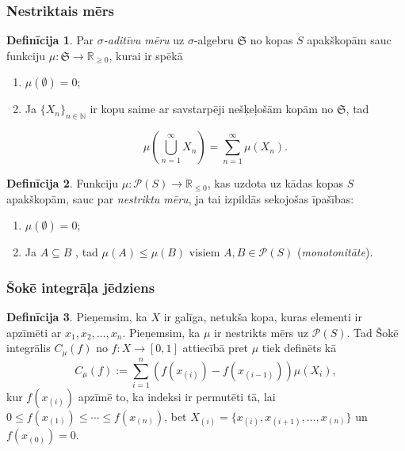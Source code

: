 \documentclass{beamer}
\theoremstyle{definition}
\newtheorem{definicija}{Definīcija}
\begin{document}
\begin{frame}
\frametitle{Nestriktais mērs}

\begin{definicija}
\footnotesize
  Par $\sigma$\emph{-aditīvu mēru} uz $\sigma$-algebru $\mathfrak{S}$ no kopas
  $S$ apakškopām sauc funkciju $\mu: \mathfrak{S} \rightarrow \mathbb{R}_{\geq
    0}$, kurai ir spēkā
  \begin{enumerate}
  \item $\mu(\emptyset)=0$;
  \item Ja $\{X_n\}_{n\in \mathbb{N}}$ ir kopu saime ar savstarpēji nešķeļošām
    kopām no $\mathfrak{S}$, tad

    $$
    \mu\left( \bigcup_{n=1}^\infty X_n \right) = \sum\limits_{n=1}^\infty\mu(X_n).
    $$
  \end{enumerate}
\end{definicija}


\begin{definicija}
\footnotesize
	Funkciju $\mu : \mathscr{P}(S) \rightarrow \mathbb{R}_{\leq 0}$, kas uzdota uz
  kādas kopas $S$ apakškopām, sauc par \emph{nestriktu mēru}, ja tai izpildās
  sekojošas īpašības:
  \begin{enumerate}
  \item $\mu (\emptyset) = 0$;
  \item Ja $ A \subseteq B$ , tad $\mu(A) \leq \mu(B)$ visiem $A,B \in
    \mathscr{P}(S)$ (\emph{monotonitāte}).
  \end{enumerate}

\end{definicija}
\end{frame}
\begin{frame}
\frametitle{Šokē integrāļa jēdziens}
\begin{definicija}
  Pieņemsim, ka $X$ ir galīga, netukša kopa, kuras elementi ir apzīmēti ar $x_1,
  x_2, \dots ,x_n$. Pieņemsim, ka $\mu$ ir nestrikts mērs uz $\mathscr{P}(S)$.
  Tad Šokē integrālis $C_\mu(f)$ no $f:X \rightarrow [0,1]$ attiecībā pret $\mu$
  tiek definēts kā
  \begin{equation*}
  C_\mu(f) := \sum\limits_{i=1}^n (f(x_{(i)})-f(x_{(i-1)}))\mu(X_{i}),
\end{equation*}
kur $f(x_{(i)})$ apzīmē to, ka indeksi ir permutēti tā, lai $0 \leq
  f(x_{(1)})\leq \cdots \leq f(x_{(n)})$, bet $ X_{(i)} =
  {\{x_{(i)},x_{(i+1)},\dots,x_{(n)}\}}$ un $f(x_{(0)}) = 0$.

\end{definicija}
\end{frame}
\end{document}

